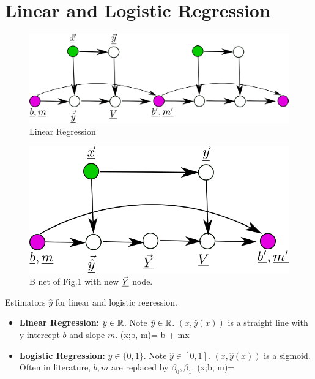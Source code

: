 \chapter{Linear and Logistic Regression}
\begin{refsection}

\begin{figure}[h!]
\centering
\includegraphics[width=5in]{linreg/linreg.png}
\caption{Linear Regression} 
\end{figure}
\begin{figure}[h!]
\centering
\includegraphics[width=5in]{linreg/linreg-emul.png}
\caption{B net of Fig.1  with new $\vec{\underline{Y}}$ node.}
\end{figure}



Estimators $\hat{y}$ for linear and logistic regression.
\begin{itemize}
\item 

\textbf{Linear Regression:} $y\in { \mathbb{R}}$. Note $\hat{y}\in { \mathbb{R}}$. $(x,\hat{y}(x))$ is a straight line with y-intercept $b$ and slope $m$.
\beq
{}(x;b, m)= b + mx
\eeq

\item
\textbf{Logistic Regression:} $y\in\{0, 1\}$. Note $\hat{y}\in [0,1]$. $
(x,\hat{y}(x))$ is a sigmoid. Often in literature, $b,m$ are replaced by $\beta_0, \beta_1$. 
\beq
{}(x;b, m)=
\eeq
\end{itemize}


\end{refsection}
